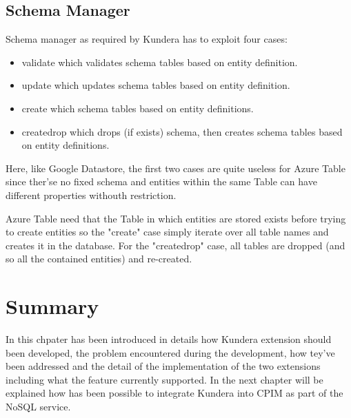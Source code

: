 \subsection{Schema Manager}
Schema manager as required by Kundera has to exploit four cases:
\begin{itemize}
\item validate which validates schema tables based on entity definition.
\item update which updates schema tables based on entity definition.
\item create which schema tables based on entity definitions.
\item create\textunderscore drop which drops (if exists) schema, then creates schema tables based on entity definitions.
\end{itemize}
Here, like Google Datastore, the first two cases are quite useless for Azure Table since ther'se no fixed schema and entities within the same Table can have different properties withouth restriction.

Azure Table need that the Table in which entities are stored exists before trying to create entities so the "create" case simply iterate over all table names and creates it in the database. 
For the "create\textunderscore drop" case, all tables are dropped (and so all the contained entities) and re-created.

\section{Summary}
In this chpater has been introduced in details how Kundera extension should been developed, the problem encountered during the development, how tey've been addressed and the detail of the implementation of the two extensions including what the feature currently supported.
In the next chapter will be explained how has been possible to integrate Kundera into CPIM as part of the NoSQL service.
